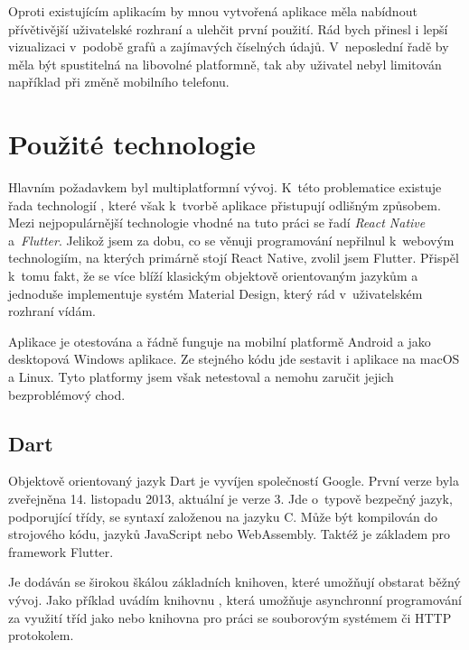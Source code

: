 \documentclass[
  biblatex,
  figures=true,
  tables=false,
  glossaries,
  index
]{kidiplom}
\begin{document}
Oproti existujícím aplikacím by mnou vytvořená aplikace měla nabídnout přívětivější uživatelské rozhraní a ulehčit první použití. Rád bych přinesl i lepší vizualizaci v~podobě grafů a zajímavých číselných údajů. V~neposlední řadě by měla být spustitelná na libovolné platformně, tak aby uživatel nebyl limitován například při změně mobilního telefonu.

\section{Použité technologie}

Hlavním požadavkem byl multiplatformní vývoj. K~této problematice existuje řada technologií \cite{jetbrains-crossplatform}, které však k~tvorbě aplikace přistupují odlišným způsobem. Mezi nejpopulárnější technologie vhodné na tuto práci se řadí \textit{React Native} a~\textit{Flutter}. Jelikož jsem za dobu, co se věnuji programování nepřilnul k~webovým technologiím, na kterých primárně stojí React Native, zvolil jsem Flutter. Přispěl k~tomu fakt, že se více blíží klasickým objektově orientovaným jazykům a jednoduše implementuje systém Material Design, který rád v~uživatelském rozhraní vídám.

Aplikace je otestována a řádně funguje na mobilní platformě Android a jako desktopová Windows aplikace. Ze stejného kódu jde sestavit i aplikace na macOS a Linux. Tyto platformy jsem však netestoval a nemohu zaručit jejich bezproblémový chod.

\subsection{Dart}
Objektově orientovaný jazyk Dart \cite{dart} je vyvíjen společností Google. První verze byla zveřejněna 14. listopadu 2013, aktuální je verze 3. Jde o~typově bezpečný jazyk, podporující třídy, se syntaxí založenou na jazyku C. Může být kompilován do strojového kódu, jazyků JavaScript nebo WebAssembly. Taktéž je základem pro framework Flutter.

Je dodáván se širokou škálou základních knihoven, které umožňují obstarat běžný vývoj. Jako příklad uvádím knihovnu , která umožňuje asynchronní programování za využití tříd jako  nebo knihovna  pro práci se souborovým systémem či HTTP protokolem.
\end{document}
